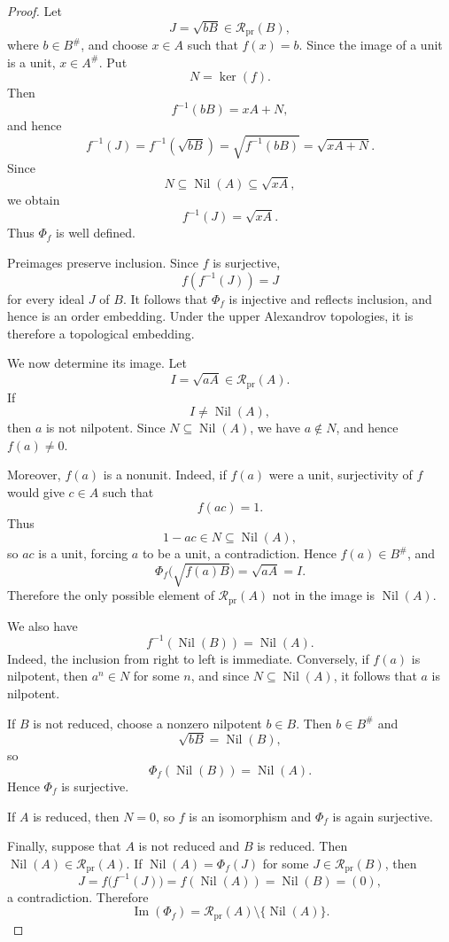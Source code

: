 \documentclass[11pt]{amsart}
\theoremstyle{plain}
\theoremstyle{definition}
\theoremstyle{remark}
\numberwithin{equation}{section}
\begin{document}
\begin{proof}
	Let
	\[
	J=\sqrt{bB}\in\mathcal R_{\mathrm{pr}}(B),
	\]
	where $b\in B^\#$, and choose $x\in A$ such that $f(x)=b$.
	Since the image of a unit is a unit, $x\in A^\#$. Put
	\[
	N=\ker(f).
	\]
	Then
	\[
	f^{-1}(bB)=xA+N,
	\]
	and hence
	\[
	f^{-1}(J)
	=
	f^{-1}(\sqrt{bB})
	=
	\sqrt{f^{-1}(bB)}
	=
	\sqrt{xA+N}.
	\]
	Since
	\[
	N\subseteq\operatorname{Nil}(A)\subseteq\sqrt{xA},
	\]
	we obtain
	\[
	f^{-1}(J)=\sqrt{xA}.
	\]
	Thus $\Phi_f$ is well defined.
	
	Preimages preserve inclusion. Since $f$ is surjective,
	\[
	f(f^{-1}(J))=J
	\]
	for every ideal $J$ of $B$. It follows that $\Phi_f$ is injective
	and reflects inclusion, and hence is an order embedding. Under the
	upper Alexandrov topologies, it is therefore a topological
	embedding.
	
	We now determine its image. Let
	\[
	I=\sqrt{aA}\in\mathcal R_{\mathrm{pr}}(A).
	\]
	If
	\[
	I\neq\operatorname{Nil}(A),
	\]
	then $a$ is not nilpotent. Since $N\subseteq\operatorname{Nil}(A)$,
	we have $a\notin N$, and hence $f(a)\neq0$.
	
	Moreover, $f(a)$ is a nonunit. Indeed, if $f(a)$ were a unit,
	surjectivity of $f$ would give $c\in A$ such that
	\[
	f(ac)=1.
	\]
	Thus
	\[
	1-ac\in N\subseteq\operatorname{Nil}(A),
	\]
	so $ac$ is a unit, forcing $a$ to be a unit, a contradiction.
	Hence $f(a)\in B^\#$, and
	\[
	\Phi_f\bigl(\sqrt{f(a)B}\bigr)
	=
	\sqrt{aA}
	=
	I.
	\]
	Therefore the only possible element of
	$\mathcal R_{\mathrm{pr}}(A)$ not in the image is
	$\operatorname{Nil}(A)$.
	
	We also have
	\[
	f^{-1}(\operatorname{Nil}(B))
	=
	\operatorname{Nil}(A).
	\]
	Indeed, the inclusion from right to left is immediate. Conversely,
	if $f(a)$ is nilpotent, then $a^n\in N$ for some $n$, and since
	$N\subseteq\operatorname{Nil}(A)$, it follows that $a$ is
	nilpotent.
	
	If $B$ is not reduced, choose a nonzero nilpotent $b\in B$.
	Then $b\in B^\#$ and
	\[
	\sqrt{bB}=\operatorname{Nil}(B),
	\]
	so
	\[
	\Phi_f(\operatorname{Nil}(B))
	=
	\operatorname{Nil}(A).
	\]
	Hence $\Phi_f$ is surjective.
	
	If $A$ is reduced, then $N=0$, so $f$ is an isomorphism and
	$\Phi_f$ is again surjective.
	
Finally, suppose that $A$ is not reduced and $B$ is reduced. Then
$\operatorname{Nil}(A)\in\mathcal R_{\mathrm{pr}}(A)$. If
$\operatorname{Nil}(A)=\Phi_f(J)$ for some
$J\in\mathcal R_{\mathrm{pr}}(B)$, then
\[
J=f\bigl(f^{-1}(J)\bigr)
=f(\operatorname{Nil}(A))
=\operatorname{Nil}(B)
=(0),
\]
a contradiction. Therefore
\[
\operatorname{Im}(\Phi_f)
=
\mathcal R_{\mathrm{pr}}(A)
\setminus\{\operatorname{Nil}(A)\}.
\]
\end{proof}
\end{document}
